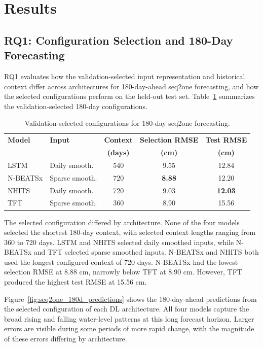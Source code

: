 \documentclass[conference]{IEEEtran}
\begin{document}
\section{Results}

\subsection{RQ1: Configuration Selection and 180-Day Forecasting}

RQ1 evaluates how the validation-selected input representation and historical context differ across architectures for 180-day-ahead seq2one forecasting, and how the selected configurations perform on the held-out test set. Table~\ref{tab:rq1_180d} summarizes the validation-selected 180-day configurations.

\begin{table}[htbp]
    \centering
    \caption{Validation-selected configurations for 180-day seq2one forecasting.}
    \label{tab:rq1_180d}
    \footnotesize
    \setlength{\tabcolsep}{6pt}
    \renewcommand{\arraystretch}{1.05}
        \begin{tabular}{@{}llccc@{}}
        \hline
        \textbf{Model} & \textbf{Input} & \textbf{Context} &
        \textbf{Selection RMSE} & \textbf{Test RMSE} \\
         & & \textbf{(days)} & \textbf{(cm)} & \textbf{(cm)} \\
        \hline
        LSTM     & Daily smooth.  & 540 & 9.55 & 12.84 \\
        N-BEATSx & Sparse smooth. & 720 & \textbf{8.88} & 12.20 \\
        NHITS    & Daily smooth.  & 720 & 9.03 & \textbf{12.03} \\
        TFT      & Sparse smooth. & 360 & 8.90 & 15.56 \\
        \hline
        \end{tabular}
\end{table}

The selected configuration differed by architecture. None of the four models selected the shortest 180-day context, with selected context lengths ranging from 360 to 720 days. LSTM and NHITS selected daily smoothed inputs, while N-BEATSx and TFT selected sparse smoothed inputs. N-BEATSx and NHITS both used the longest configured context of 720 days. N-BEATSx had the lowest selection RMSE at 8.88 cm, narrowly below TFT at 8.90 cm. However, TFT produced the highest test RMSE at 15.56 cm.

Figure~\ref{fig:seq2one_180d_predictions} shows the 180-day-ahead predictions from the selected configuration of each DL architecture. All four models capture the broad rising and falling water-level patterns at this long forecast horizon. Larger errors are visible during some periods of more rapid change, with the magnitude of these errors differing by architecture.
\end{document}
